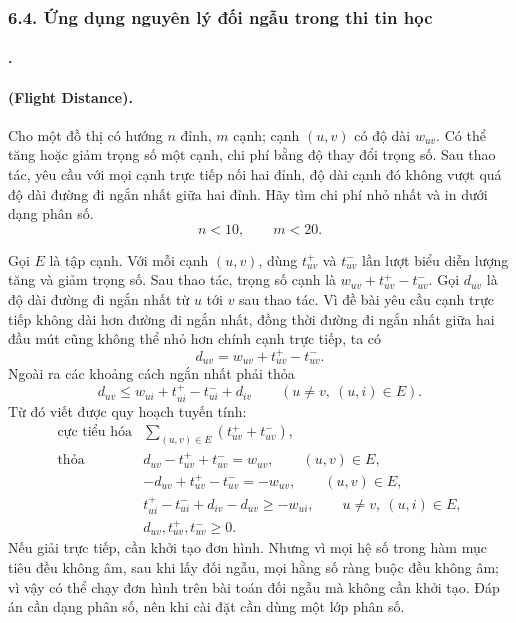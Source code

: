 \documentclass[11pt]{article}
\begin{document}
\subsubsection*{6.4. Ứng dụng nguyên lý đối ngẫu trong thi tin học}

\paragraph{.}

\paragraph{ (Flight Distance).}
Cho một đồ thị có hướng \(n\) đỉnh, \(m\) cạnh; cạnh \((u,v)\) có độ dài
\(w_{uv}\). Có thể tăng hoặc giảm trọng số một cạnh, chi phí bằng độ thay đổi
trọng số. Sau thao tác, yêu cầu với mọi cạnh trực tiếp nối hai đỉnh, độ dài
cạnh đó không vượt quá độ dài đường đi ngắn nhất giữa hai đỉnh. Hãy tìm chi
phí nhỏ nhất và in dưới dạng phân số.
\[
  n<10,\qquad m<20.
\]

Gọi \(E\) là tập cạnh. Với mỗi cạnh \((u,v)\), dùng \(t_{uv}^+\) và
\(t_{uv}^-\) lần lượt biểu diễn lượng tăng và giảm trọng số. Sau thao tác,
trọng số cạnh là \(w_{uv}+t_{uv}^+-t_{uv}^-\). Gọi \(d_{uv}\) là độ dài đường
đi ngắn nhất từ \(u\) tới \(v\) sau thao tác. Vì đề bài yêu cầu cạnh trực
tiếp không dài hơn đường đi ngắn nhất, đồng thời đường đi ngắn nhất giữa hai
đầu mút cũng không thể nhỏ hơn chính cạnh trực tiếp, ta có
\[
  d_{uv}=w_{uv}+t_{uv}^+-t_{uv}^-.
\]
Ngoài ra các khoảng cách ngắn nhất phải thỏa
\[
  d_{uv}\le w_{ui}+t_{ui}^+-t_{ui}^-+d_{iv}
  \qquad (u\ne v,\ (u,i)\in E).
\]
Từ đó viết được quy hoạch tuyến tính:
\[
\begin{array}{ll}
\text{cực tiểu hóa} &
  \displaystyle \sum_{(u,v)\in E}(t_{uv}^+ + t_{uv}^-),\\
\text{thỏa} &
  d_{uv}-t_{uv}^+ + t_{uv}^- = w_{uv},\qquad (u,v)\in E,\\
& -d_{uv}+t_{uv}^+ - t_{uv}^- = -w_{uv},\qquad (u,v)\in E,\\
& t_{ui}^+-t_{ui}^-+d_{iv}-d_{uv}\ge -w_{ui},
  \qquad u\ne v,\ (u,i)\in E,\\
& d_{uv},t_{uv}^+,t_{uv}^-\ge 0.
\end{array}
\]
Nếu giải trực tiếp, cần khởi tạo đơn hình. Nhưng vì mọi hệ số trong hàm mục
tiêu đều không âm, sau khi lấy đối ngẫu, mọi hằng số ràng buộc đều không âm;
vì vậy có thể chạy đơn hình trên bài toán đối ngẫu mà không cần khởi tạo.
Đáp án cần dạng phân số, nên khi cài đặt cần dùng một lớp phân số.
\end{document}
